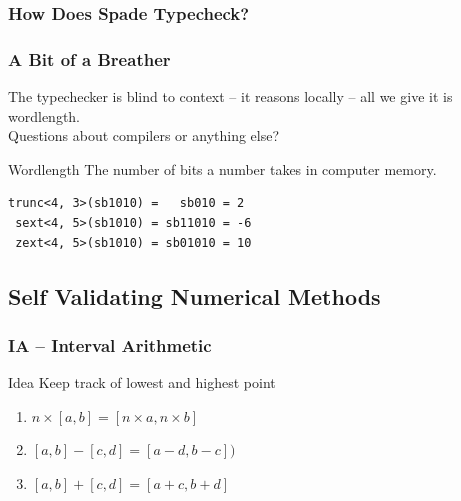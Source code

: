 \documentclass{beamer}
\begin{document}
\begin{frame}[containsverbatim]
\frametitle{How Does Spade Typecheck?}
\end{frame}

\begin{frame}
\frametitle{A Bit of a Breather}
\centering
The typechecker is blind to context -- it reasons locally -- all we give it is wordlength. \\[2em]
\pause
Questions about compilers or anything else?
\end{frame}

\begin{frame}[containsverbatim]
\begin{block}{Wordlength}
The number of bits a number takes in computer memory.
\centering
\begin{verbatim}
trunc<4, 3>(sb1010) =   sb010 = 2
 sext<4, 5>(sb1010) = sb11010 = -6
 zext<4, 5>(sb1010) = sb01010 = 10
\end{verbatim}
\end{block}
\end{frame}

\subsection{Self Validating Numerical Methods}

\begin{frame}
\frametitle{IA -- Interval Arithmetic}

\begin{block}{Idea}
Keep track of lowest and highest point
\end{block}

\begin{enumerate}
  \item $n \times [a, b] = [n \times a, n \times b]$
  \item $[a, b] - [c, d] = [a - d, b - c])$
  \item $[a, b] + [c, d] = [a + c, b + d]$
\end{enumerate}
\end{frame}
\end{document}
